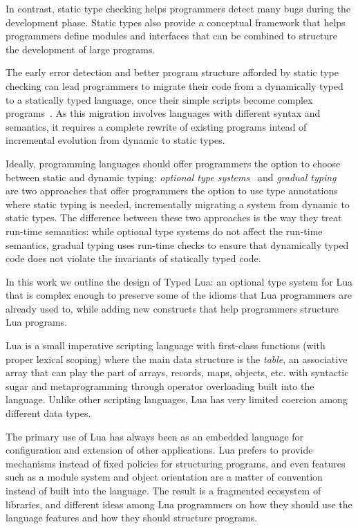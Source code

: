 \documentclass[preprint]{sig-alternate}
\begin{document}
In contrast, static type checking helps programmers detect many 
bugs during the development phase. Static types also provide a
conceptual framework that helps programmers define modules
and interfaces that can be combined to structure the development
of large programs.

The early error detection and better program structure afforded by
static type checking can lead programmers to migrate their code from
a dynamically typed to a statically typed language, once their simple
scripts become complex programs~\citep{tobin-hochstadt2006ims}.
As this migration involves languages with different syntax and
semantics, it requires a complete rewrite of existing programs intead
of incremental evolution from dynamic to static types.

Ideally, programming languages should offer programmers the
option to choose between static and dynamic typing:
\textit{optional type systems}~\citep{bracha2004pluggable} and
\textit{gradual typing}~\citep{siek2006gradual} are two approaches
that offer programmers the option to use type annotations where static
typing is needed, incrementally migrating a system from dynamic
to static types. The difference between these two approaches is the
way they treat run-time semantics: while optional type systems
do not affect the run-time semantics,
gradual typing uses run-time checks to ensure that dynamically typed
code does not violate the invariants of statically typed code.

In this work we outline the design of Typed Lua:
an optional type system for Lua that is complex enough to
preserve some of the idioms that Lua programmers are already used to,
while adding new constructs that help programmers structure Lua
programs.


Lua is a small imperative scripting language with first-class
functions (with proper lexical scoping) where the main data
structure is the {\em table}, an associative array that can
play the part of arrays, records, maps, objects, etc.
with syntactic sugar and metaprogramming through operator overloading built into
the language. Unlike other scripting languages, Lua has very
limited coercion among different data types.

The primary use of Lua has always been as an embedded language
for configuration and extension of other applications.
Lua prefers to provide mechanisms instead of fixed policies
for structuring programs, and even features
such as a module system and object orientation are a matter of 
convention instead of built into the language.
The result is a fragmented ecosystem of libraries, and
different ideas among Lua programmers on how they should use
the language features and how they should structure programs.
\end{document}
